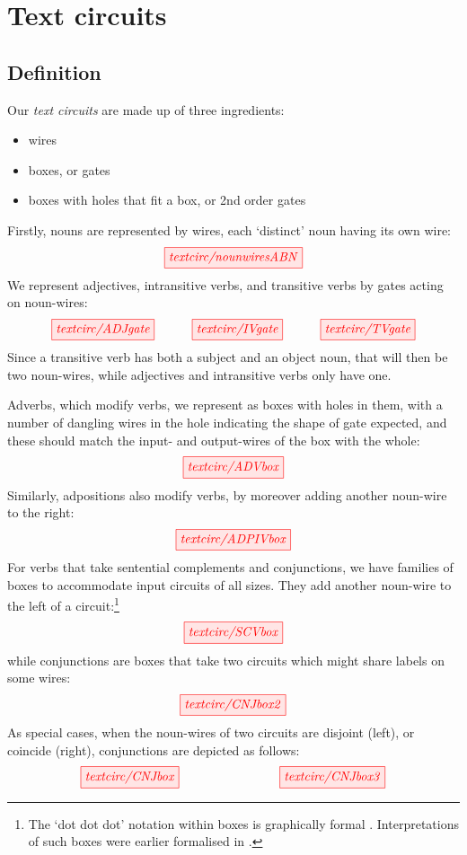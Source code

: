 \section{Text circuits}\label{sec:circs}  



\subsection{Definition}

Our \emph{text circuits} are made up of three ingredients:
\begin{itemize}
\item wires
\item boxes, or gates
\item boxes with holes that fit a box, or 2nd order gates
\end{itemize}
Firstly, nouns are represented by wires, each `distinct' noun having its own wire:
\[
\tikzfig{textcirc/nounwiresABN} 
\]
We represent adjectives, intransitive verbs, and transitive verbs by gates acting on noun-wires: 
\[
\tikzfig{textcirc/ADJgate} \quad\quad\quad \tikzfig{textcirc/IVgate} \quad\quad\quad \tikzfig{textcirc/TVgate}
\]
Since a transitive verb has both a subject and an object  noun, that will then be two noun-wires, while adjectives and intransitive verbs only have one. 

Adverbs, which modify verbs, we represent as boxes with holes in them, with a number of dangling wires in the hole indicating the shape of gate expected, and these should match the input- and output-wires  of the box with the whole:
\[
\tikzfig{textcirc/ADVbox}
\]
Similarly, adpositions also modify verbs, by moreover adding another noun-wire to the right:
\[
\tikzfig{textcirc/ADPIVbox}
\]
For verbs that take sentential complements and conjunctions, we have families of boxes to accommodate input circuits of all sizes. They add another noun-wire to the left of a circuit:\footnote{The `dot dot dot' notation within boxes is graphically formal \cite{wilson_string_2022}. Interpretations of such boxes were earlier formalised in \cite{merry_reasoning_2014,quick_-logic_2015,zamdzhiev_rewriting_2017}.}
\[
\tikzfig{textcirc/SCVbox}
\]
while conjunctions are boxes that take two circuits which might share labels on some wires:
\[
\tikzfig{textcirc/CNJbox2}
\]
As special cases, when the noun-wires of two circuits are disjoint (left), or coincide (right), conjunctions are depicted as follows:
\[
\tikzfig{textcirc/CNJbox} \qquad\qquad\qquad\qquad \tikzfig{textcirc/CNJbox3}
\]

